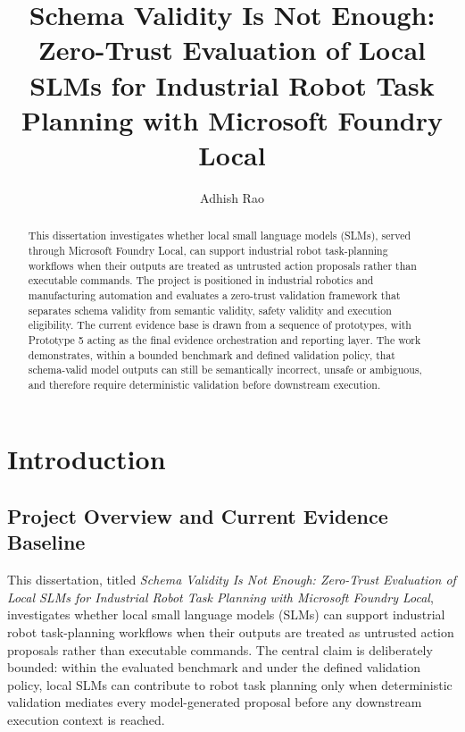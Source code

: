\documentclass[sigconf,nonacm]{acmart}
\title{Schema Validity Is Not Enough: Zero-Trust Evaluation of Local SLMs for Industrial Robot Task Planning with Microsoft Foundry Local}
\author{Adhish Rao}
\affiliation{
  \institution{University College London}
  \department{MSc Systems Engineering for the Internet of Things}
  \country{United Kingdom}
}
\begin{document}
\begin{abstract}
This dissertation investigates whether local small language models (SLMs), served through Microsoft Foundry Local, can support industrial robot task-planning workflows when their outputs are treated as untrusted action proposals rather than executable commands. The project is positioned in industrial robotics and manufacturing automation and evaluates a zero-trust validation framework that separates schema validity from semantic validity, safety validity and execution eligibility. The current evidence base is drawn from a sequence of prototypes, with Prototype 5 acting as the final evidence orchestration and reporting layer. The work demonstrates, within a bounded benchmark and defined validation policy, that schema-valid model outputs can still be semantically incorrect, unsafe or ambiguous, and therefore require deterministic validation before downstream execution.
\end{abstract}


\maketitle

\tableofcontents
\listoffigures
\listoftables

\clearpage


\section{Introduction}


\subsection{Project Overview and Current Evidence Baseline}
\label{sec:project_overview_current_baseline}

This dissertation, titled \emph{Schema Validity Is Not Enough: Zero-Trust Evaluation of Local SLMs for Industrial Robot Task Planning with Microsoft Foundry Local}, investigates whether local small language models (SLMs) can support industrial robot task-planning workflows when their outputs are treated as untrusted action proposals rather than executable commands. The central claim is deliberately bounded: within the evaluated benchmark and under the defined validation policy, local SLMs can contribute to robot task planning only when deterministic validation mediates every model-generated proposal before any downstream execution context is reached.
\end{document}
